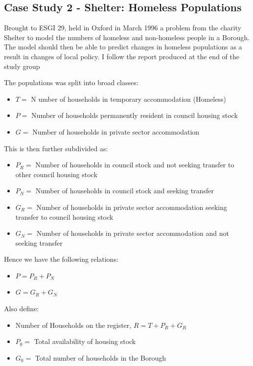 \documentclass[11pt]{article} %
\begin{document}
	
	
	\subsection{Case Study 2 - Shelter: Homeless Populations \label{homeless}}
	

   Brought to ESGI 29, held in Oxford in March 1996 a problem from the charity Shelter to model the numbers of homeless and non-homeless people in a Borough. The model should then be able to predict changes in homeless populations as a result in changes of local policy. I follow the report produced at the end of the study group \cite{Shelter1996}
	
	The populations was split into broad classes: 
	\begin{itemize}
		\item $ T= $ N umber of households in temporary accommodation (Homeless)
		\item $  P= $ Number of households permanently resident in council housing stock
		\item $ G= $ Number of households in private sector accommodation 
	\end{itemize}
	This is then further subdivided as:
	\begin{itemize}
		\item $ P_R= $ Number of households in council stock and not  seeking transfer to other council housing stock 
		\item $ P_N= $ Number of households in council stock and seeking transfer 
		\item $ G_R= $ Number of households in private sector accommodation seeking transfer to council housing stock 
		\item $ G_N= $ Number of households in private sector accommodation and not seeking transfer
	\end{itemize}

Hence we have the following relations:
\begin{itemize}
	\item $ P=P_R+P_N $
	\item $ G=G_R+G_N $
	
\end{itemize}

Also define: 
\begin{itemize}
	\item Number of Households on the register,  $  R=T+P_R+G_R $
	\item $ P_0 = $ Total availability of housing stock 
	\item $ G_0= $ Total number of households in the Borough
\end{itemize}
\end{document}
